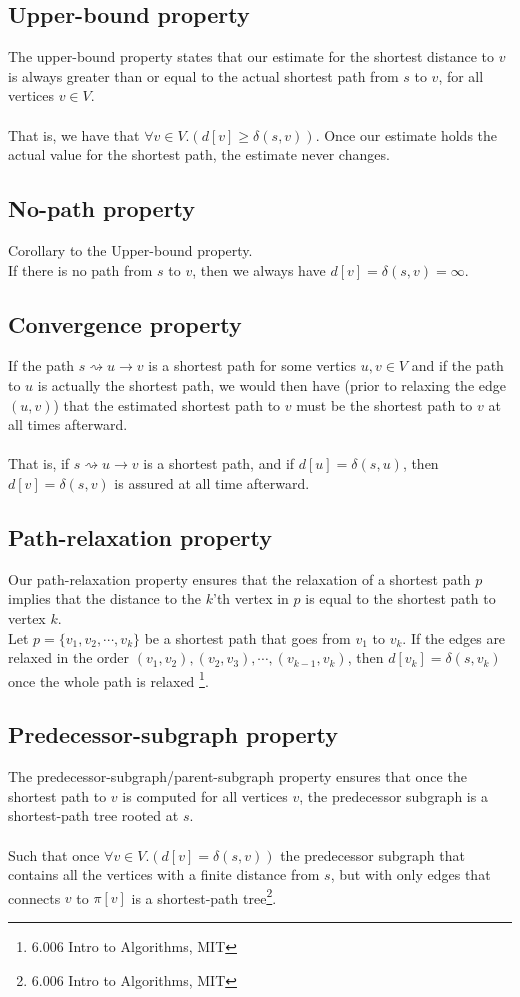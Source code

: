 \documentclass[11pt]{article}
\begin{document}
\subsection{Upper-bound property}
The upper-bound property states that our estimate for the shortest distance to $v$ is always greater than or equal to the actual shortest path from $s$ to $v$, for all vertices $v\in V$.\\\\
That is, we have that $\forall v \in V.(d[v]\geq \delta(s,v))$. Once our estimate holds the actual value for the shortest path, the estimate never changes.\\
\subsection{No-path property} Corollary to the Upper-bound property.\\
If there is no path from $s$ to $v$, then we always have $d[v] = \delta(s,v) = \infty$.\\
\subsection{Convergence property}
If the path $s \rightsquigarrow u \rightarrow v$ is a shortest path for some vertics $u,v\in V$ and if the path to $u$ is actually the shortest path, we would then have (prior to relaxing the edge $(u,v)$) that the estimated shortest path to $v$ must be the shortest path to $v$ at all times afterward.\\\\
That is, if $s\rightsquigarrow u\rightarrow v$ is a shortest path, and if $d[u] = \delta(s,u)$, then $d[v] = \delta(s,v)$ is assured at all time afterward.\\
\subsection{Path-relaxation property}
Our path-relaxation property ensures that the relaxation of a shortest path $p$ implies that the distance to the $k$'th vertex in $p$ is equal to the shortest path to vertex $k$.\\
Let $p = \{v_{1}, v_{2},\cdots ,v_{k}\}$ be a shortest path that goes from $v_{1}$ to $v_{k}$. If the edges are relaxed in the order $(v_{1},v_{2}), (v_{2},v_{3}), \cdots , (v_{k-1}, v_{k})$, then $d[v_{k}] = \delta(s,v_{k})$ once the whole path is relaxed \footnote{6.006 Intro to Algorithms, MIT}.
\subsection{Predecessor-subgraph property}
The predecessor-subgraph/parent-subgraph property ensures that once the shortest path to $v$ is computed for all vertices $v$, the predecessor subgraph is a shortest-path tree rooted at $s$.\\\\
Such that once $\forall v \in V.(d[v] = \delta(s,v))$ the predecessor subgraph that contains all the vertices with a finite distance from $s$, but with only edges that connects $v$ to $\pi[v]$ is a shortest-path tree\footnote{6.006 Intro to Algorithms, MIT}.
\end{document}
